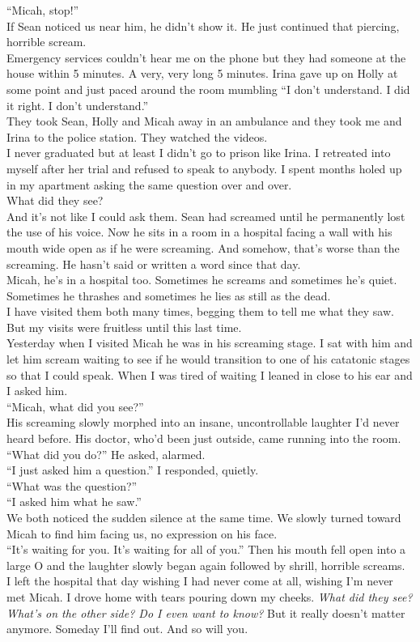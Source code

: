 \documentclass[a5paper]{scrartcl}
\begin{document}
\enquote{Micah, stop!}\\
If Sean noticed us near him, he didn't show it. He just continued that piercing, horrible scream.\\
Emergency services couldn't hear me on the phone but they had someone at the house within 5 minutes. A very, very long 5 minutes. Irina gave up on Holly at some point and just paced around the room mumbling \enquote{I don't understand. I did it right. I don't understand.}\\
They took Sean, Holly and Micah away in an ambulance and they took me and Irina to the police station. They watched the videos.\\
I never graduated but at least I didn't go to prison like Irina. I retreated into myself after her trial and refused to speak to anybody. I spent months holed up in my apartment asking the same question over and over.\\
What did they see?\\
And it's not like I could ask them. Sean had screamed until he permanently lost the use of his voice. Now he sits in a room in a hospital facing a wall with his mouth wide open as if he were screaming. And somehow, that's worse than the screaming. He hasn't said or written a word since that day.\\
Micah, he's in a hospital too. Sometimes he screams and sometimes he's quiet. Sometimes he thrashes and sometimes he lies as still as the dead.\\
I have visited them both many times, begging them to tell me what they saw. But my visits were fruitless until this last time.\\
Yesterday when I visited Micah he was in his screaming stage. I sat with him and let him scream waiting to see if he would transition to one of his catatonic stages so that I could speak. When I was tired of waiting I leaned in close to his ear and I asked him.\\
\enquote{Micah, what did you see?}\\
His screaming slowly morphed into an insane, uncontrollable laughter I’d never heard before. His doctor, who’d been just outside, came running into the room.\\
\enquote{What did you do?} He asked, alarmed.\\
\enquote{I just asked him a question.} I responded, quietly.\\
\enquote{What was the question?}\\
\enquote{I asked him what he saw.}\\
We both noticed the sudden silence at the same time. We slowly turned toward Micah to find him facing us, no expression on his face.\\
\enquote{It's waiting for you. It's waiting for all of you.} Then his mouth fell open into a large O and the laughter slowly began again followed by shrill, horrible screams.\\
I left the hospital that day wishing I had never come at all, wishing I'm never met Micah. I drove home with tears pouring down my cheeks. \textit{What did they see? What’s on the other side? Do I even want to know?} But it really doesn’t matter anymore. Someday I’ll find out. And so will you.
\end{document}
